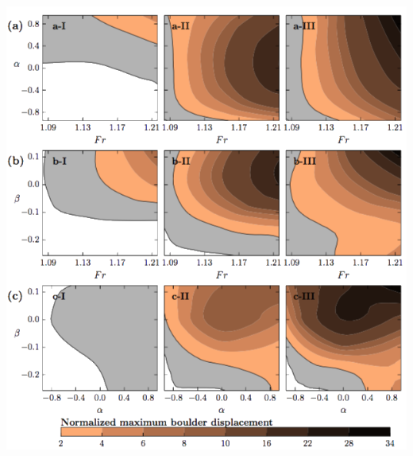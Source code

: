 \documentclass{beamer}
\begin{document}
\begin{frame}[c]
  \begin{center}
  \vspace*{-0.25cm}\hspace*{-0.5cm}  {\includegraphics[scale=0.39]{3d_result2t.png}}
  \end{center}
\end{frame}
\end{document}
